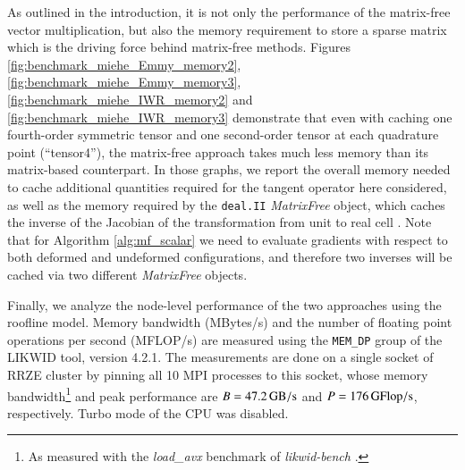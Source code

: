 \documentclass[times,doublespace]{nmeauth}
\begin{document}
As outlined in the introduction, it is not only the performance of the matrix-free vector multiplication, but also the memory requirement to store a sparse matrix which is the driving force behind matrix-free methods.
Figures \ref{fig:benchmark_miehe_Emmy_memory2}, \ref{fig:benchmark_miehe_Emmy_memory3}, \ref{fig:benchmark_miehe_IWR_memory2} and \ref{fig:benchmark_miehe_IWR_memory3} demonstrate that even with caching one fourth-order symmetric tensor and one second-order tensor at each quadrature point (``tensor4''), the matrix-free approach takes much less memory than its matrix-based counterpart.
In those graphs, we report the overall memory needed to cache additional quantities required for the tangent operator here considered,
as well as the memory required by the \texttt{deal.II} \textit{MatrixFree} object, which caches the inverse of the Jacobian of the transformation
from unit to real cell \cite{kronbichler12}.
Note that for Algorithm \ref{alg:mf_scalar} we need to evaluate gradients with respect to both deformed and undeformed
configurations, and therefore two inverses will be cached via two different \textit{MatrixFree} objects.

Finally, we analyze the node-level performance of the two approaches using the roofline model.
Memory bandwidth (MBytes/s) and the number of floating point operations per second (MFLOP/s) are measured using the \texttt{MEM\_DP} group of the LIKWID \cite{likwid} tool, version 4.2.1.
The measurements are done on a single socket of RRZE cluster by pinning all 10 MPI processes to this socket, whose
memory bandwidth\footnote{As measured with the \textit{load\_avx} benchmark of \textit{likwid-bench} \cite{likwid}.} and peak performance are $B=47.2 \,\rm{GB/s}$ and $P=176\, \rm{GFlop/s}$, respectively.
Turbo mode of the CPU was disabled.
\end{document}
